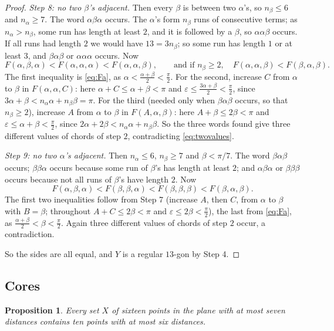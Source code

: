 \documentclass[11pt]{amsart}
\newtheorem{proposition}[theorem]{Proposition}
\theoremstyle{definition}
\theoremstyle{remark}
\begin{document}
\begin{proof}
\emph{Step 8: no two $\beta$'s adjacent.} Then every $\beta$ is between two $\alpha$'s, so
$n_\beta\le6$ and $n_\alpha\ge7$. The word $\alpha\beta\alpha$ occurs. The $\alpha$'s form $n_\beta$ runs
of consecutive terms; as $n_\alpha>n_\beta$, some run has length at least $2$, and it is followed by a
$\beta$, so $\alpha\alpha\beta$ occurs. If all runs had length $2$ we would have $13=3n_\beta$; so some run
has length $1$ or at least $3$, and $\beta\alpha\beta$ or $\alpha\alpha\alpha$ occurs. Now
\[
  F(\alpha,\beta,\alpha)<F(\alpha,\alpha,\alpha)<F(\alpha,\alpha,\beta),\qquad\text{and if }
  n_\beta\ge2,\quad F(\alpha,\alpha,\beta)<F(\beta,\alpha,\beta).
\]
The first inequality is \eqref{eq:Fa}, as $\alpha<\frac{\alpha+\beta}2<\frac\pi2$. For the second, increase
$C$ from $\alpha$ to $\beta$ in $F(\alpha,\alpha,C)$: here $\alpha+C\le\alpha+\beta<\pi$ and
$\varepsilon\le\frac{3\alpha+\beta}2<\frac\pi2$, since $3\alpha+\beta<n_\alpha\alpha+n_\beta\beta=\pi$.
For the third (needed only when $\beta\alpha\beta$ occurs, so that $n_\beta\ge2$), increase $A$ from
$\alpha$ to $\beta$ in $F(A,\alpha,\beta)$: here $A+\beta\le2\beta<\pi$ and
$\varepsilon\le\alpha+\beta<\frac\pi2$, since $2\alpha+2\beta<n_\alpha\alpha+n_\beta\beta$. So the three
words found give three different values of chords of step $2$, contradicting \eqref{eq:twovalues}.

\emph{Step 9: no two $\alpha$'s adjacent.} Then $n_\alpha\le6$, $n_\beta\ge7$ and $\beta<\pi/7$. The word
$\beta\alpha\beta$ occurs; $\beta\beta\alpha$ occurs because some run of $\beta$'s has length at least $2$;
and $\alpha\beta\alpha$ or $\beta\beta\beta$ occurs because not all runs of $\beta$'s have length $2$. Now
\[
  F(\alpha,\beta,\alpha)<F(\beta,\beta,\alpha)<F(\beta,\beta,\beta)<F(\beta,\alpha,\beta).
\]
The first two inequalities follow from Step 7 (increase $A$, then $C$, from $\alpha$ to $\beta$ with
$B=\beta$; throughout $A+C\le2\beta<\pi$ and $\varepsilon\le2\beta<\frac\pi2$), the last from
\eqref{eq:Fa}, as $\frac{\alpha+\beta}2<\beta<\frac\pi2$. Again three different values of chords of step $2$
occur, a contradiction.

So the sides are all equal, and $Y$ is a regular $13$-gon by Step 4.
\end{proof}

\subsection{Cores}
\begin{proposition}\label{prop:core}
Every set $X$ of sixteen points in the plane with at most seven distances contains ten points with at most
six distances.
\end{proposition}
\end{document}
